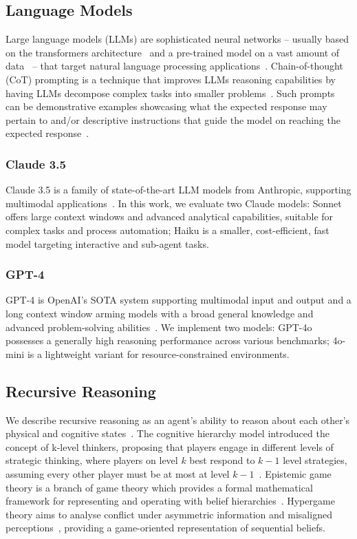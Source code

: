 \documentclass[runningheads]{llncs}
\begin{document}
\subsection{Language Models}

Large language models (LLMs) are sophisticated neural networks -- usually based on the transformers architecture~\cite{gillioz2020overview} and a pre-trained model on a vast amount of data~\cite{qiu2020pre} -- that target natural language processing applications~\cite{zhao2023survey}. Chain-of-thought (CoT) prompting is a technique that improves LLMs reasoning capabilities by having LLMs decompose complex tasks into smaller problems~\cite{wei2023chainofthoughtpromptingelicitsreasoning}. Such prompts can be demonstrative examples showcasing what the expected response may pertain to and/or descriptive instructions that guide the model on reaching the expected response~\cite{yu2023towards}.

\subsubsection{Claude 3.5}
Claude 3.5 is a family of state-of-the-art LLM models from Anthropic, supporting multimodal applications~\cite{claude35}. In this work, we evaluate two Claude models: Sonnet offers large context windows and advanced analytical capabilities, suitable for complex tasks and process automation; Haiku is a smaller, cost-efficient, fast model targeting interactive and sub-agent tasks.

\subsubsection{GPT-4}
GPT-4 is OpenAI's SOTA system supporting multimodal input and output and a long context window arming models with a broad general knowledge and advanced problem-solving abilities~\cite{openai2024gpt4technicalreport}. We implement two models: GPT-4o possesses a generally high reasoning performance across various benchmarks; 4o-mini is a lightweight variant for resource-constrained environments.

\subsection{Recursive Reasoning}

We describe recursive reasoning as an agent's ability to reason about each other's physical and cognitive states~\cite{wen2019probabilistic}. The cognitive hierarchy model introduced the concept of k-level thinkers, proposing that players engage in different levels of strategic thinking, where players on level $k$ best respond to $k-1$ level strategies, assuming every other player must be at most at level $k-1$~\cite{camerer2004cognitive}. Epistemic game theory is a branch of game theory which provides a formal mathematical framework for representing and operating with belief hierarchies~\cite{dekel2015epistemic}. Hypergame theory aims to analyse conflict under asymmetric information and misaligned perceptions~\cite{Bennett1980}, providing a game-oriented representation of sequential beliefs.
\end{document}
